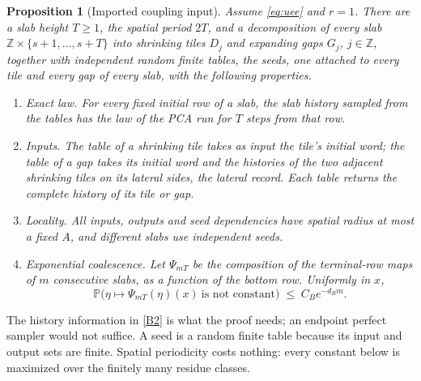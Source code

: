 \documentclass[11pt]{article}
\theoremstyle{plain}
\newtheorem{proposition}[theorem]{Proposition}
\theoremstyle{definition}
\theoremstyle{remark}
\newcommand{\Z}{\mathbb{Z}}
\newcommand{\Prob}{\mathbb{P}}
\begin{document}
\begin{proposition}[Imported coupling input]
\label{prop:berard}
Assume \eqref{eq:uee} and $r=1$. There are a slab height $T\ge1$, the spatial period $2T$, and a decomposition of every slab $\Z\times\{s+1,\dots,s+T\}$ into shrinking tiles $D_j$ and expanding gaps $G_j$, $j\in\Z$, together with independent random finite tables, the \emph{seeds}, one attached to every tile and every gap of every slab, with the following properties.
\begin{enumerate}[label=(B\arabic*)]
\item\label{B1} \emph{Exact law.} For every fixed initial row of a slab, the slab history sampled from the tables has the law of the PCA run for $T$ steps from that row.
\item\label{B2} \emph{Inputs.} The table of a shrinking tile takes as input the tile's initial word; the table of a gap takes its initial word and the histories of the two adjacent shrinking tiles on its lateral sides, the \emph{lateral record}. Each table returns the complete history of its tile or gap.
\item\label{B3} \emph{Locality.} All inputs, outputs and seed dependencies have spatial radius at most a fixed $A$, and different slabs use independent seeds.
\item\label{B4} \emph{Exponential coalescence.} Let $\Psi_{mT}$ be the composition of the terminal-row maps of $m$ consecutive slabs, as a function of the bottom row. Uniformly in $x$,
\begin{equation}
\Prob\bigl(\eta\mapsto\Psi_{mT}(\eta)(x)\ \text{is not constant}\bigr)\;\le\;C_Be^{-d_Bm}.
\label{eq:B4}
\end{equation}
\end{enumerate}
\end{proposition}

The history information in \ref{B2} is what the proof needs; an endpoint perfect sampler would not suffice. A seed is a random finite table because its input and output sets are finite. Spatial periodicity costs nothing: every constant below is maximized over the finitely many residue classes.
\end{document}

